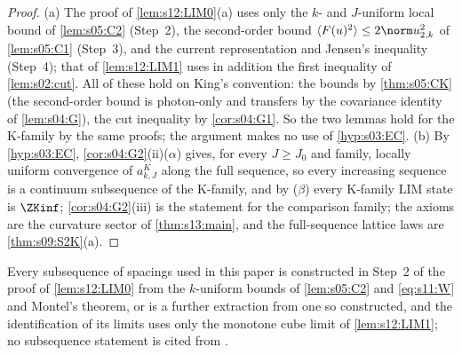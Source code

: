 \begin{proof}
(a) The proof of \cref{lem:s12:LIM0}(a) uses only the $k$- and $J$-uniform local bound of \cref{lem:s05:C2} (Step~2), the second-order bound $\langle F(u)^2\rangle\le2\norm u^2_{2,k}$ of \cref{lem:s05:C1} (Step~3), and the current representation and Jensen's inequality (Step~4); that of \cref{lem:s12:LIM1} uses in addition the first inequality of \cref{lem:s02:cut}. All of these hold on King's convention: the bounds by \cref{thm:s05:CK} (the second-order bound is photon-only and transfers by the covariance identity of \cref{lem:s04:G}), the cut inequality by \cref{cor:s04:G1}. So the two lemmas hold for the K-family by the same proofs; the argument makes no use of \cref{hyp:s03:EC}. (b) By \cref{hyp:s03:EC}, \cref{cor:s04:G2}(ii)($\alpha$) gives, for every $J\ge J_0$ and family, locally uniform convergence of $a^K_{k,J}$ along the full sequence, so every increasing sequence is a continuum subsequence of the K-family, and by ($\beta$) every K-family LIM state is $\ZKinf$; \cref{cor:s04:G2}(iii) is the statement for the comparison family; the axioms are the curvature sector of \cref{thm:s13:main}, and the full-sequence lattice laws are \cref{thm:s09:S2K}(a).
\end{proof}

\begin{remark}\label{rem:s12:K9}
Every subsequence of spacings used in this paper is constructed in Step~2 of the proof of \cref{lem:s12:LIM0} from the $k$-uniform bounds of \cref{lem:s05:C2} and \eqref{eq:s11:W} and Montel's theorem, or is a further extraction from one so constructed, and the identification of its limits uses only the monotone cube limit of \cref{lem:s12:LIM1}; no subsequence statement is cited from \cite{K2}.
\end{remark}

